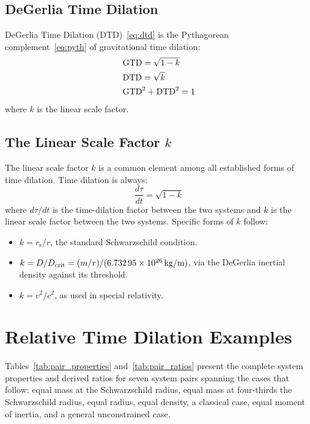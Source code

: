 \documentclass[twoside,twocolumn,9pt,fleqn]{article}
\begin{document}
\subsection{DeGerlia Time Dilation}
DeGerlia Time Dilation (DTD)~\eqref{eq:dtd} is the Pythagorean complement~\eqref{eq:pyth} of gravitational time dilation:
\begin{align}
&\mathrm{GTD} = \sqrt{1-k} \notag\\
&\mathrm{DTD} = \sqrt{k} \label{eq:dtd}\\
&\mathrm{GTD}^2 + \mathrm{DTD}^2 = 1 \label{eq:pyth}
\end{align}
where $k$ is the linear scale factor.

\subsection{The Linear Scale Factor $k$}\label{sec:k}
The linear scale factor $k$ is a common element among all established forms of time dilation. Time dilation is always:
\begin{equation*}
\frac{d\tau}{dt} = \sqrt{1 - k}
\end{equation*}
where $d\tau/dt$ is the time-dilation factor between the two systems and $k$ is the linear scale factor between the two systems. Specific forms of $k$ follow:
\begin{itemize}
\item $k = r_{\mathrm{s}}/r$, the standard Schwarzschild condition.
\item $k = D/D_{\mathrm{crit}} = (m/r)/(\num{6.73295e26}\,\unit[per-mode=symbol]{\kilogram\per\meter})$, via the DeGerlia inertial density against its threshold.
\item $k = v^2/c^2$, as used in special relativity.
\end{itemize}

\section{Relative Time Dilation Examples}\label{sec:expressions}\label{app:pair_table}

Tables~\ref{tab:pair_properties} and~\ref{tab:pair_ratios} present the complete system properties and derived ratios for seven system pairs spanning the cases that follow: equal mass at the Schwarzschild radius, equal mass at four-thirds the Schwarzschild radius, equal radius, equal density, a classical case, equal moment of inertia, and a general unconstrained case.
\end{document}
